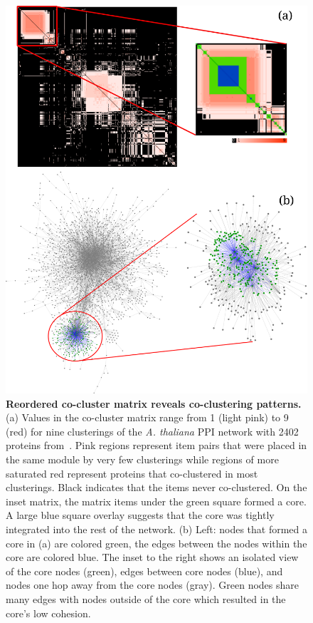 \documentclass[12pt]{cmuthesis}
\newcommand{\Athal}{\textit{A. thaliana}\xspace}
\begin{document}
  \begin{figure}[htb!]
    \centering
    \includegraphics[width=0.6\linewidth]{figures/coral_vidal_matrix}
    \caption{\textbf{Reordered co-cluster matrix reveals co-clustering patterns.} (a) Values in the co-cluster matrix range from 1 (light pink) to 9 (red) for nine clusterings of the \Athal PPI network with 2402 proteins from~\cite{Vidal2011}. Pink regions represent item pairs that were placed in the same module by very few clusterings while regions of more saturated red represent proteins that co-clustered in most clusterings. Black indicates that the items never co-clustered. On the inset matrix, the matrix items under the green square formed a core. A large blue square overlay suggests that the core was tightly integrated into the rest of the network. (b) Left: nodes that formed a core in (a) are colored green, the edges between the nodes within the core are colored blue. The inset to the right shows an isolated view of the core nodes (green), edges between core nodes (blue), and nodes one hop away from the core nodes (gray). Green nodes share many edges with nodes outside of the core which resulted in the core's low cohesion.}
    \label{fig:coral:big_matrix}
  \end{figure}

\end{document}
